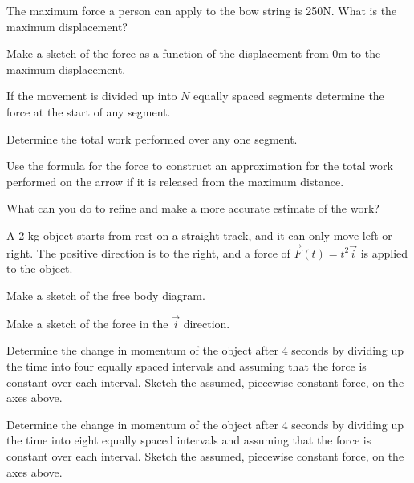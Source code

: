 \begin{problem}
\begin{subproblem}
      \vfill
    \item The maximum force a person can apply to the bow string is
      250N. What is the maximum displacement?
      \vfill
    \item Make a sketch of the force as a function of the displacement
      from 0m to the maximum displacement.
      \vfill
      \clearpage
    \item If the movement is divided up into $N$ equally spaced segments
      determine the force at the start of any segment.
      \vfill
    \item Determine the total work performed over any one segment.
      \vfill
    \item Use the formula for the force to construct an approximation
      for the total work performed on the arrow if it is released from
      the maximum distance.
      \vfill
    \item What can you do to refine and make a more accurate estimate of
      the work?
    \end{subproblem}
\item A 2 kg object starts from rest on a straight track, and it can
  only move left or right. The positive direction is to the right, and
  a force of $\vec{F}(t)=t^2 \vec{i}$ is applied to the object.

  \begin{subproblem}
    \item Make a sketch of the free body diagram.
      \vspace{4em}
    \item Make a sketch of the force in the $\vec{i}$ direction. \\
      \scalebox{0.5}{}

    \item Determine the change in momentum of the object after 4
      seconds by dividing up the time into four equally spaced
      intervals and assuming that the force is constant over each
      interval. Sketch the assumed, piecewise constant force, on the
      axes above.
      \vfill
    \item Determine the change in momentum of the object after 4
      seconds by dividing up the time into eight equally spaced
      intervals and assuming that the force is constant over each
      interval. Sketch the assumed, piecewise constant force, on the
      axes above.
      \vfill
  \end{subproblem}


\end{problem}
